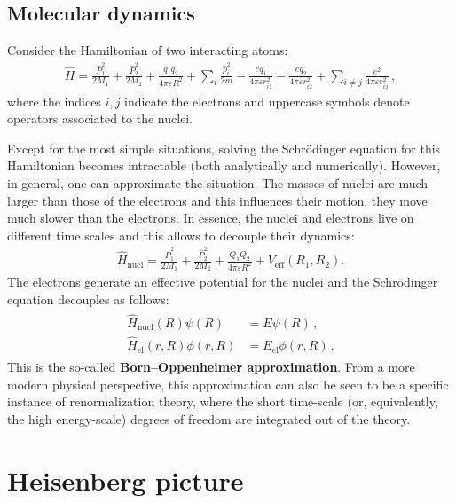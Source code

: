 
\subsection{Molecular dynamics}

    Consider the Hamiltonian of two interacting atoms:
    \begin{gather}
        \widehat{H} = \frac{\widehat{P}_1^2}{2M_1} + \frac{\widehat{P}_2^2}{2M_2} + \frac{q_1q_2}{4\pi\varepsilon R^2} + \sum_i\frac{\widehat{p}_i^2}{2m} - \frac{eq_1}{4\pi\varepsilon r_{i1}^2} - \frac{eq_2}{4\pi\varepsilon r_{i2}^2} + \sum_{i\neq j}\frac{e^2}{4\pi\varepsilon r_{ij}^2}\,,
    \end{gather}
    where the indices $i,j$ indicate the electrons and uppercase symbols denote operators associated to the nuclei.

    Except for the most simple situations, solving the Schr\"odinger equation for this Hamiltonian becomes intractable (both analytically and numerically). However, in general, one can approximate the situation. The masses of nuclei are much larger than those of the electrons and this influences their motion, they move much slower than the electrons. In essence, the nuclei and electrons live on different time scales and this allows to decouple their dynamics:
    \begin{gather}
        \widehat{H}_{\text{nucl}} = \frac{\widehat{P}_1^2}{2M_1} + \frac{\widehat{P}_2^2}{2M_2} + \frac{Q_1Q_2}{4\pi\varepsilon R^2} + V_{\text{eff}}(R_1,R_2).
    \end{gather}
    The electrons generate an effective potential for the nuclei and the Schr\"odinger equation decouples as follows:
    \begin{gather}
        \begin{aligned}
            \widehat{H}_{\text{nucl}}(R)\psi(R) &= E\psi(R)\,,\\
            \widehat{H}_{\text{el}}(r,R)\phi(r,R) &= E_{\text{el}}\phi(r,R)\,.
        \end{aligned}
    \end{gather}
    This is the so-called \textbf{Born--Oppenheimer approximation}. From a more modern physical perspective, this approximation can also be seen to be a specific instance of renormalization theory, where the short time-scale (or, equivalently, the high energy-scale) degrees of freedom are integrated out of the theory.

\section{Heisenberg picture}

